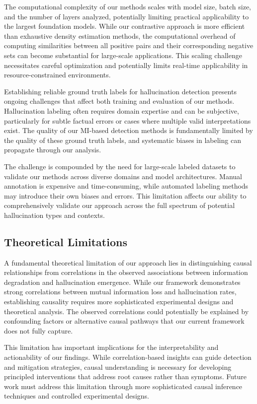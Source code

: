 The computational complexity of our methods scales with model size, batch size, and the number of layers analyzed, potentially limiting practical applicability to the largest foundation models. While our contrastive approach is more efficient than exhaustive density estimation methods, the computational overhead of computing similarities between all positive pairs and their corresponding negative sets can become substantial for large-scale applications. This scaling challenge necessitates careful optimization and potentially limits real-time applicability in resource-constrained environments.

Establishing reliable ground truth labels for hallucination detection presents ongoing challenges that affect both training and evaluation of our methods. Hallucination labeling often requires domain expertise and can be subjective, particularly for subtle factual errors or cases where multiple valid interpretations exist. The quality of our MI-based detection methods is fundamentally limited by the quality of these ground truth labels, and systematic biases in labeling can propagate through our analysis.

The challenge is compounded by the need for large-scale labeled datasets to validate our methods across diverse domains and model architectures. Manual annotation is expensive and time-consuming, while automated labeling methods may introduce their own biases and errors. This limitation affects our ability to comprehensively validate our approach across the full spectrum of potential hallucination types and contexts.

\subsection{Theoretical Limitations}

A fundamental theoretical limitation of our approach lies in distinguishing causal relationships from correlations in the observed associations between information degradation and hallucination emergence. While our framework demonstrates strong correlations between mutual information loss and hallucination rates, establishing causality requires more sophisticated experimental designs and theoretical analysis. The observed correlations could potentially be explained by confounding factors or alternative causal pathways that our current framework does not fully capture.

This limitation has important implications for the interpretability and actionability of our findings. While correlation-based insights can guide detection and mitigation strategies, causal understanding is necessary for developing principled interventions that address root causes rather than symptoms. Future work must address this limitation through more sophisticated causal inference techniques and controlled experimental designs.

